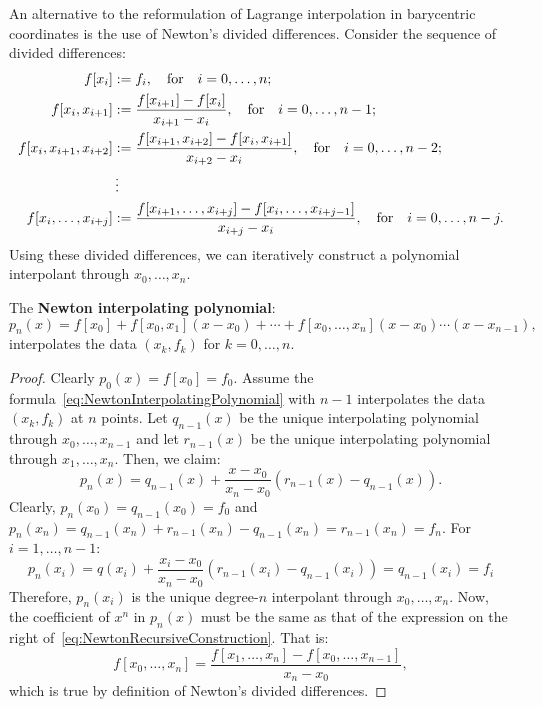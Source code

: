 An alternative to the reformulation of Lagrange interpolation in barycentric coordinates is the use of Newton's divided differences. Consider the sequence of divided differences:
\begin{align*}
f[x_i] & := f_i,\quad{\rm for}\quad i=0,\ldots,n;\\
f[x_i,x_{i+1}] & := \dfrac{f[x_{i+1}]-f[x_i]}{x_{i+1}-x_i},\quad{\rm for}\quad i=0,\ldots,n-1;\\
f[x_i,x_{i+1},x_{i+2}] & := \dfrac{f[x_{i+1},x_{i+2}]-f[x_i,x_{i+1}]}{x_{i+2}-x_i},\quad{\rm for}\quad i=0,\ldots,n-2;\\
& \vdots\\
f[x_i,\ldots,x_{i+j}] & := \dfrac{f[x_{i+1},\ldots,x_{i+j}]-f[x_i,\ldots,x_{i+j-1}]}{x_{i+j}-x_i},\quad{\rm for}\quad i=0,\ldots,n-j.
\end{align*}
Using these divided differences, we can iteratively construct a polynomial interpolant through $x_0,\ldots,x_n$.
\begin{theorem}
The {\bf Newton interpolating polynomial}:
\begin{equation}\label{eq:NewtonInterpolatingPolynomial}
p_n(x) = f[x_0] + f[x_0,x_1](x-x_0) + \cdots + f[x_0,\ldots,x_n](x-x_0)\cdots(x-x_{n-1}),
\end{equation}
interpolates the data $(x_k,f_k)$ for $k=0,\ldots,n$.
\end{theorem}
\begin{proof}
Clearly $p_0(x) = f[x_0] = f_0$. Assume the formula~\eqref{eq:NewtonInterpolatingPolynomial} with $n-1$ interpolates the data $(x_k,f_k)$ at $n$ points. Let $q_{n-1}(x)$ be the unique interpolating polynomial through $x_0,\ldots,x_{n-1}$ and let $r_{n-1}(x)$ be the unique interpolating polynomial through $x_1,\ldots,x_n$. Then, we claim:
\begin{equation}\label{eq:NewtonRecursiveConstruction}
p_n(x) = q_{n-1}(x) + \dfrac{x-x_0}{x_n-x_0}(r_{n-1}(x)-q_{n-1}(x)).
\end{equation}
Clearly, $p_n(x_0) = q_{n-1}(x_0) = f_0$ and $p_n(x_n) = q_{n-1}(x_n) + r_{n-1}(x_n) - q_{n-1}(x_n) = r_{n-1}(x_n) = f_n$. For $i = 1,\ldots,n-1$:
\[
p_n(x_i) = q(x_i) + \dfrac{x_i-x_0}{x_n-x_0}(r_{n-1}(x_i)-q_{n-1}(x_i)) = q_{n-1}(x_i) = f_i
\]
Therefore, $p_n(x_i)$ is the unique degree-$n$ interpolant through $x_0,\ldots,x_n$. Now, the coefficient of $x^n$ in $p_n(x)$ must be the same as that of the expression on the right of~\eqref{eq:NewtonRecursiveConstruction}. That is:
\[
f[x_0,\ldots,x_n] = \dfrac{f[x_1,\ldots,x_n]-f[x_0,\ldots,x_{n-1}]}{x_n-x_0},
\]
which is true by definition of Newton's divided differences.
\end{proof}


